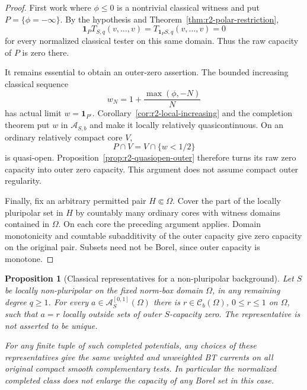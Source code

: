 \documentclass[11pt,a4paper]{article}
\numberwithin{equation}{section}
\newtheorem{proposition}[theorem]{Proposition}
\theoremstyle{definition}
\theoremstyle{remark}
\newcommand{\Cb}{\mathcal C_b}
\begin{document}
\begin{proof}
First work where $\phi\leq0$ is a nontrivial classical witness
and put $P=\{\phi=-\infty\}$. By the hypothesis and
Theorem~\ref{thm:r2-polar-restriction},
\[
 \mathbf1_P T_{S,q}(v,\ldots,v)
     =T_{\mathbf1_PS,q}(v,\ldots,v)=0
\]
for every normalized classical tester on this same domain.
Thus the raw capacity of $P$ is zero there.

It remains essential to obtain an outer-zero assertion.
The bounded increasing classical sequence
\[
 w_N=1+\frac{\max(\phi,-N)}{N}
\]
has actual limit $w=\mathbf1_{P^c}$.
Corollary~\ref{cor:r2-local-increasing} and the completion
theorem put $w$ in $\mathcal A_{S,b}$ and make it locally
relatively quasicontinuous. On an ordinary relatively compact
core $V$,
\[
 P\cap V=V\cap\{w<1/2\}
\]
is quasi-open. Proposition~\ref{prop:r2-quasiopen-outer}
therefore turns its raw zero capacity into outer zero
capacity. This argument does not assume compact outer
regularity.

Finally, fix an arbitrary permitted pair $H\Subset\Omega$.
Cover the part of the locally pluripolar set in $H$ by
countably many ordinary cores with witness domains contained
in $\Omega$. On each core the preceding argument applies.
Domain monotonicity and countable subadditivity of the outer
capacity give zero capacity on the original pair.
Subsets need not be Borel, since outer capacity is monotone.
\end{proof}

\begin{proposition}[Classical representatives for a non-pluripolar background]
\label{prop:r3-nonpolar-classical-representative}
Let $S$ be locally non-pluripolar on the fixed norm-box domain
$\Omega$, in any remaining degree $q\geq1$. For every
$a\in\mathcal A_S^{[0,1]}(\Omega)$ there is
$r\in\Cb(\Omega)$, $0\leq r\leq1$ on $\Omega$, such that
$a=r$ locally outside sets of outer $S$-capacity zero.
The representative is not asserted to be unique.

For any finite tuple of such completed potentials, any choices
of these representatives give the same weighted and unweighted
BT currents on all original compact smooth complementary tests.
In particular the normalized completed class does not enlarge
the capacity of any Borel set in this case.
\end{proposition}
\end{document}
